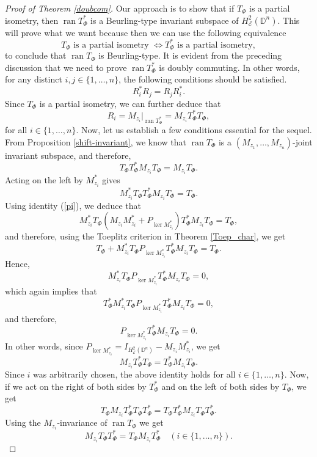 \documentclass[12pt]{amsart}
\theoremstyle{definition}
\newcommand{\D}{\mathbb{D}}
\DeclareMathOperator{\ran}{ran}
\newcommand{\1}{{\mbox{\bf 1}}}
\newcommand{\cle}{\mathcal{E}}
\begin{document}
\begin{proof}[Proof of Theorem \ref{doubcom}]
Our approach is to show that if $T_{\Phi}$ is a partial isometry, then $\ran T_{\Phi}^*$ is a Beurling-type invariant subspace of $H_{\cle}^2(\D^n)$.  This will prove what we want because then we can use the following equivalence
\[
T_{\Phi} \text{ is a partial isometry } \Leftrightarrow T_{\Phi}^* \text{ is a partial isometry},
\]
to conclude that $\ran T_{\Phi}$ is Beurling-type. It is evident from the preceding discussion that we need to prove $\ran T_{\Phi}^*$ is doubly commuting.  In other words, for any distinct $i,j \in \{1,\ldots,n\}$, the following conditions should be satisfied.
\[
R_i ^* R_j = R_j R_i^*.
\]
Since $T_{\Phi}$ is a partial isometry, we can further deduce that
\[
R_i = M_{z_i}|_{\ran T_{\Phi}^*} = M_{z_i} T_{\Phi}^*T_{\Phi},
\]
for all $i \in \{1,\ldots,n\}$. Now, let us establish a few conditions essential for the sequel. From Proposition \ref{shift-invariant}, we know that $\ran T_{\Phi}$ is a $(M_{z_1}, \ldots, M_{z_n})$-joint invariant subspace, and therefore,
\[
T_{\Phi}T_{\Phi}^* M_{z_i} T_{\Phi} = M_{z_i} T_{\Phi}.
\]
Acting on the left by $M_{z_i}^*$ gives
\[
M_{z_i}^* T_{\Phi}T_{\Phi}^* M_{z_i} T_{\Phi} = T_{\Phi}.
\]
Using identity (\ref{pi}), we deduce that
\[
M_{z_i}^* T_{\Phi} (M_{z_i}M_{z_i}^* + P_{\ker M_{z_i}^*})T_{\Phi}^* M_{z_i} T_{\Phi} = T_{\Phi},
\]
and therefore, using the Toeplitz criterion in Theorem \ref{Toep_char}, we get
\[
T_{\Phi} + M_{z_i}^* T_{\Phi} P_{\ker M_{z_i}^*}T_{\Phi}^* M_{z_i} T_{\Phi} = T_{\Phi}.
\]
Hence,
\[
M_{z_i}^* T_{\Phi}P_{\ker M_{z_i}^*}T_{\Phi}^* M_{z_i} T_{\Phi}  = 0,
\]
which again implies that 
\[
T_{\Phi}^* M_{z_i}^* T_{\Phi}P_{\ker M_{z_i}^*}T_{\Phi}^* M_{z_i} T_{\Phi}  = 0,
\]
and therefore,
\[
P_{\ker M_{z_i}^*}T_{\Phi}^* M_{z_i} T_{\Phi}  = 0.
\]
In other words, since $P_{\ker M_{z_i}^*} = I_{H_{\cle}^2(\D^n)} - M_{z_i} M_{z_i}^*$, we get
\begin{equation}\label{partial_1}
M_{z_i} T_{\Phi}^* T_{\Phi} = T_{\Phi}^* M_{z_i} T_{\Phi}.
\end{equation}
Since $i$ was arbitrarily chosen, the above identity holds for all $i \in \{1,\ldots, n\}$. Now, if we act on the right of both sides by $T_{\Phi}^*$ and on the left of both sides by $T_{\Phi}$, we get
\[
 T_{\Phi} M_{z_i} T_{\Phi}^* T_{\Phi} T_{\Phi}^* = T_{\Phi}T_{\Phi}^* M_{z_i} T_{\Phi} T_{\Phi}^*.
\]
Using the $M_{z_i}$-invariance of $\ran T_{\Phi}$ we get
\begin{equation}\label{partial_2}
M_{z_i} T_{\Phi}  T_{\Phi}^* = T_{\Phi} M_{z_i} T_{\Phi}^*  \quad (i \in \{1,\ldots, n\}).

\end{equation}
\end{proof}
\end{document}
